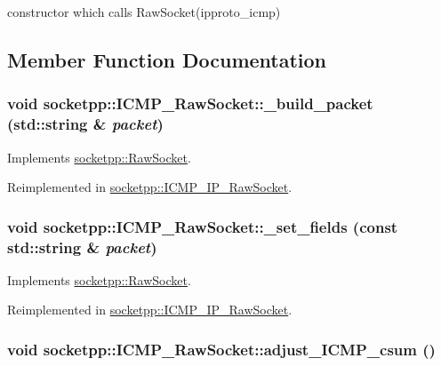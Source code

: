 constructor which calls RawSocket(ipproto\_\-icmp) 



\subsection{Member Function Documentation}
\hypertarget{classsocketpp_1_1ICMP__RawSocket_d8aa8d45c57eb77ab99ee84f1c5dd7da}{
\subsubsection[{\_\-build\_\-packet}]{\setlength{\rightskip}{0pt plus 5cm}void socketpp::ICMP\_\-RawSocket::\_\-build\_\-packet (std::string \& {\em packet})}}
\label{classsocketpp_1_1ICMP__RawSocket_d8aa8d45c57eb77ab99ee84f1c5dd7da}




Implements \hyperlink{classsocketpp_1_1RawSocket_eb0a3f716c0fc46efa4123acf0fe1e66}{socketpp::RawSocket}.

Reimplemented in \hyperlink{classsocketpp_1_1ICMP__IP__RawSocket_49a62078d6febf7a11b9350de1e23903}{socketpp::ICMP\_\-IP\_\-RawSocket}.\hypertarget{classsocketpp_1_1ICMP__RawSocket_e183b11c080f5d74dbc386ec53e7feb5}{
\subsubsection[{\_\-set\_\-fields}]{\setlength{\rightskip}{0pt plus 5cm}void socketpp::ICMP\_\-RawSocket::\_\-set\_\-fields (const std::string \& {\em packet})}}
\label{classsocketpp_1_1ICMP__RawSocket_e183b11c080f5d74dbc386ec53e7feb5}




Implements \hyperlink{classsocketpp_1_1RawSocket_45e6b041703cb8ae0f93dd19766865d5}{socketpp::RawSocket}.

Reimplemented in \hyperlink{classsocketpp_1_1ICMP__IP__RawSocket_6d2f188d46030afa13f9c3971d43d518}{socketpp::ICMP\_\-IP\_\-RawSocket}.\hypertarget{classsocketpp_1_1ICMP__RawSocket_ab00bba6ed9fe98ca771fc3310983c97}{
\subsubsection[{adjust\_\-ICMP\_\-csum}]{\setlength{\rightskip}{0pt plus 5cm}void socketpp::ICMP\_\-RawSocket::adjust\_\-ICMP\_\-csum ()}}
\label{classsocketpp_1_1ICMP__RawSocket_ab00bba6ed9fe98ca771fc3310983c97}


